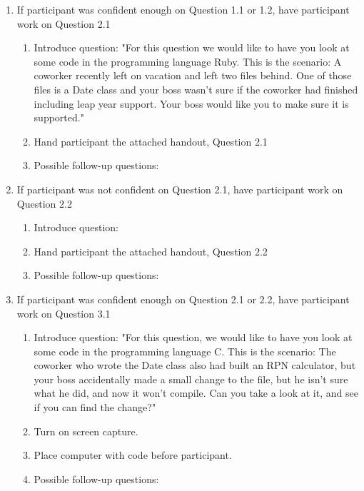 \documentclass{article}
\begin{document}
\begin{enumerate}
  \item If participant was confident enough on Question 1.1 or 1.2, have participant work on Question 2.1
   \begin{enumerate}
    \item Introduce question: "For this question we would like to have you look at some code in the programming language Ruby. This is the scenario: A coworker recently left on vacation and left two files behind. One of those files is a Date class and your boss wasn't sure if the coworker had finished including leap year support. Your boss would like you to make sure it is supported."
    \item Hand participant the attached handout, Question 2.1
    \item Possible follow-up questions:
  \end{enumerate}
  \item If participant was not confident on Question 2.1, have participant work on Question 2.2
   \begin{enumerate}
    \item Introduce question:
    \item Hand participant the attached handout, Question 2.2
    \item Possible follow-up questions:
  \end{enumerate}
  \item If participant was confident enough on Question 2.1 or 2.2, have participant work on Question 3.1
   \begin{enumerate}
    \item Introduce question: "For this question, we would like to have you look at some code in the programming language C. This is the scenario: The coworker who wrote the Date class also had built an RPN calculator, but your boss accidentally made a small change to the file, but he isn't sure what he did, and now it won't compile.  Can you take a look at it, and see if you can find the change?" 
    \item Turn on screen capture.
    \item Place computer with code before participant.
    \item Possible follow-up questions:
  \end{enumerate}
  
\end{enumerate}
\end{document}
